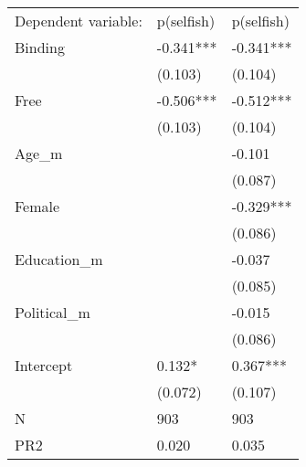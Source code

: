 \begin{tabular}{lll}
Dependent variable: & p(selfish) & p(selfish) \\
Binding & -0.341*** & -0.341*** \\
 & (0.103) & (0.104) \\
Free & -0.506*** & -0.512*** \\
 & (0.103) & (0.104) \\
Age_m &  & -0.101 \\
 &  & (0.087) \\
Female &  & -0.329*** \\
 &  & (0.086) \\
Education_m &  & -0.037 \\
 &  & (0.085) \\
Political_m &  & -0.015 \\
 &  & (0.086) \\
Intercept & 0.132* & 0.367*** \\
 & (0.072) & (0.107) \\
N & 903 & 903 \\
PR2 & 0.020 & 0.035 \\
\end{tabular}

